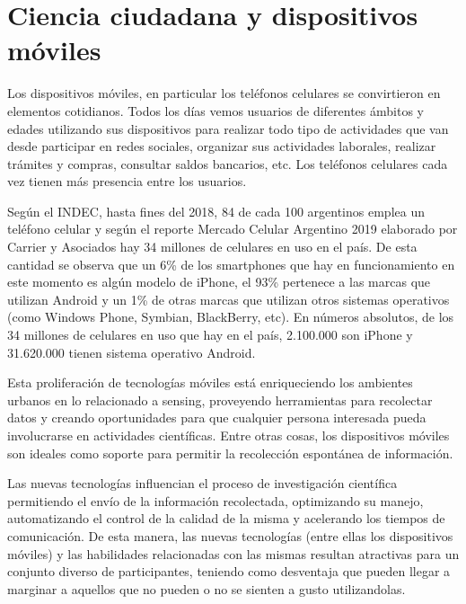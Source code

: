 	
\section{Ciencia ciudadana y dispositivos móviles}

	Los dispositivos móviles, en particular los teléfonos celulares se convirtieron en elementos cotidianos. Todos los días vemos usuarios de diferentes ámbitos y edades utilizando sus dispositivos para realizar todo tipo de actividades que van desde participar en redes sociales, organizar sus actividades laborales, realizar trámites y compras, consultar saldos bancarios, etc. Los teléfonos celulares cada vez tienen más presencia entre los usuarios. 
	
	Según el INDEC, hasta fines del 2018, 84 de cada 100 argentinos emplea un teléfono celular \cite{INDEC} y según el reporte Mercado Celular Argentino 2019 elaborado por Carrier y Asociados hay 34 millones de celulares en uso en el país. De esta cantidad se observa que un 6\% de los smartphones que hay en funcionamiento en este momento es algún modelo de iPhone, el 93\% pertenece a las marcas que utilizan Android y un 1\% de otras marcas que utilizan otros sistemas operativos (como Windows Phone, Symbian, BlackBerry, etc). En números absolutos, de los 34 millones de celulares en uso que hay en el país, 2.100.000 son iPhone y 31.620.000 tienen sistema operativo Android. \cite{carrier}	
		
	Esta proliferación de tecnologías móviles está enriqueciendo los ambientes urbanos en lo relacionado a sensing, proveyendo herramientas para recolectar datos y creando oportunidades para que cualquier persona interesada pueda involucrarse en actividades científicas. Entre otras cosas, los dispositivos móviles son ideales como soporte para permitir la recolección espontánea de información. \cite{kim2013sensr}
	
	Las nuevas tecnologías influencian el proceso de investigación científica permitiendo el envío de la información recolectada, optimizando su manejo, automatizando el control de la calidad de la misma y acelerando los tiempos de comunicación. De esta manera, las nuevas tecnologías (entre ellas los dispositivos móviles) y las habilidades relacionadas con las mismas resultan atractivas para un conjunto diverso de participantes, teniendo como desventaja que pueden llegar a marginar a aquellos que no pueden o no se sienten a gusto utilizandolas. \cite{newman2012future}
